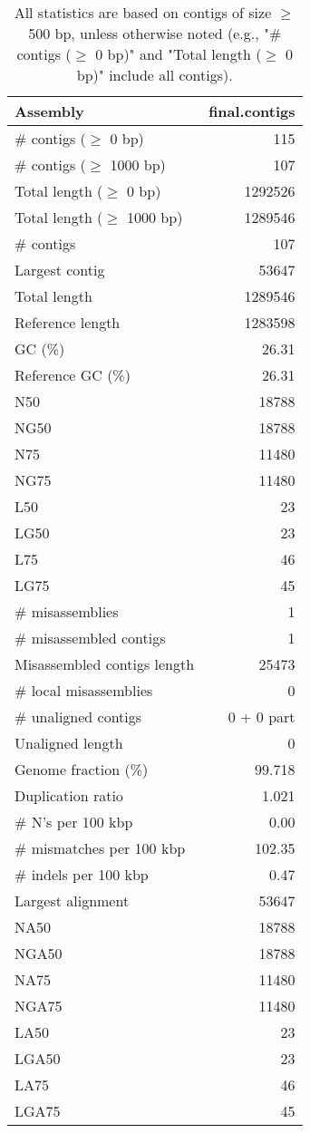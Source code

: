 \documentclass[12pt,a4paper]{article}
\begin{document}
\begin{table}[ht]
\begin{center}
\caption{All statistics are based on contigs of size $\geq$ 500 bp, unless otherwise noted (e.g., "\# contigs ($\geq$ 0 bp)" and "Total length ($\geq$ 0 bp)" include all contigs).}
\begin{tabular}{|l*{1}{|r}|}
\hline
Assembly & final.contigs \\ \hline
\# contigs ($\geq$ 0 bp) & 115 \\ \hline
\# contigs ($\geq$ 1000 bp) & 107 \\ \hline
Total length ($\geq$ 0 bp) & 1292526 \\ \hline
Total length ($\geq$ 1000 bp) & 1289546 \\ \hline
\# contigs & 107 \\ \hline
Largest contig & 53647 \\ \hline
Total length & 1289546 \\ \hline
Reference length & 1283598 \\ \hline
GC (\%) & 26.31 \\ \hline
Reference GC (\%) & 26.31 \\ \hline
N50 & 18788 \\ \hline
NG50 & 18788 \\ \hline
N75 & 11480 \\ \hline
NG75 & 11480 \\ \hline
L50 & 23 \\ \hline
LG50 & 23 \\ \hline
L75 & 46 \\ \hline
LG75 & 45 \\ \hline
\# misassemblies & 1 \\ \hline
\# misassembled contigs & 1 \\ \hline
Misassembled contigs length & 25473 \\ \hline
\# local misassemblies & 0 \\ \hline
\# unaligned contigs & 0 + 0 part \\ \hline
Unaligned length & 0 \\ \hline
Genome fraction (\%) & 99.718 \\ \hline
Duplication ratio & 1.021 \\ \hline
\# N's per 100 kbp & 0.00 \\ \hline
\# mismatches per 100 kbp & 102.35 \\ \hline
\# indels per 100 kbp & 0.47 \\ \hline
Largest alignment & 53647 \\ \hline
NA50 & 18788 \\ \hline
NGA50 & 18788 \\ \hline
NA75 & 11480 \\ \hline
NGA75 & 11480 \\ \hline
LA50 & 23 \\ \hline
LGA50 & 23 \\ \hline
LA75 & 46 \\ \hline
LGA75 & 45 \\ \hline
\end{tabular}
\end{center}
\end{table}
\end{document}
